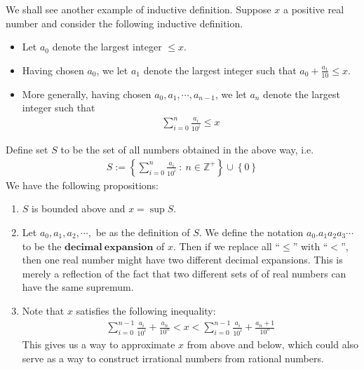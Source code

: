 \documentclass[a4paper]{ctexart}
\begin{document}
	\begin{myex}
		We shall see another example of inductive definition. Suppose $x$ a positive real number and consider the following inductive definition.
		\begin{itemize}
			\item Let $a_0$ denote the largest integer $\le x$.
			\item Having chosen $a_0$, we let $a_1$ denote the largest integer such that $a_0+\frac{a_1}{10}\le x$.
			\item More generally, having chosen $a_0,a_1,\cdots,a_{n-1}$, we let $a_n$ denote the largest integer such that
			\begin{align*}
				\sum_{i=0}^{n}\frac{a_i}{10^i}\le x
			\end{align*}
		\end{itemize}
		Define set $S$ to be the set of all numbers obtained in the above way, i.e.
		\begin{align*}
			S:=\left\{\sum_{i=0}^{n}\frac{a_i}{10^i}\ :\ n\in \mathbb{Z}^+\right\} \cup \left\{0 \right\}
		\end{align*}
		We have the following propositions:
		\begin{enumerate}
			\item $S$ is bounded above and $x=\sup S$.
			\item Let $a_0,a_1,a_2,\cdots,$ be as the definition of $S$. We define the notation $a_0.a_1a_2a_3 \cdots$ to be the $\mathbf{decimal\ expansion}$ of $x$. Then if we replace all ``$\le$'' with ``$<$'', then one real number might have two different decimal expansions. This is merely a reflection of the fact that two different sets of of real numbers can have the same supremum.
			\item Note that $x$ satisfies the following inequality:
			\begin{align*}
				\sum_{i=0}^{n-1}\frac{a_i}{10^i}+\frac{a_n}{10^n}<x<\sum_{i=0}^{n-1}\frac{a_i}{10^i}+\frac{a_n+1}{10^n}
			\end{align*}
			This gives us a way to approximate $x$ from above and below, which could also serve as a way to construct irrational numbers from rational numbers.
		\end{enumerate}
	\end{myex}
\end{document}
